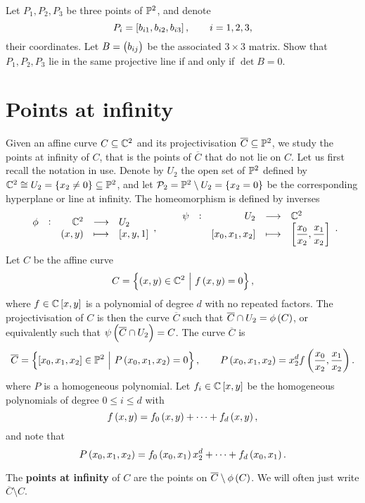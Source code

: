 \begin{exercise**}
\label{ex:19}
Let $ P_1, P_2, P_3 $ be three points of $ \mathbb{P}^2 $, and denote
$$ P_i = \sbr{b_{i1}, b_{i2}, b_{i3}}, \qquad i = 1, 2, 3, $$
their coordinates. Let $ B = \br{b_{ij}} $ be the associated $ 3 \times 3 $ matrix. Show that $ P_1, P_2, P_3 $ lie in the same projective line if and only if $ \det B = 0 $.
\end{exercise**}

\pagebreak

\section{Points at infinity}

Given an affine curve $ C \subseteq \mathbb{C}^2 $ and its projectivisation $ \overline{C} \subseteq \mathbb{P}^2 $, we study the points at infinity of $ C $, that is the points of $ \overline{C} $ that do not lie on $ C $. Let us first recall the notation in use. Denote by $ U_2 $ the open set of $ \mathbb{P}^2 $ defined by $ \CC^2 \cong U_2 = \cbr{x_2 \ne 0} \subseteq \PP^2 $, and let $ \PPP_2 = \PP^2 \setminus U_2 = \cbr{x_2 = 0} $ be the corresponding hyperplane or line at infinity. The homeomorphism is defined by inverses
$$ \function[\phi]{\CC^2}{U_2}{\br{x, y}}{\sbr{x, y, 1}}, \qquad \function[\psi]{U_2}{\CC^2}{\sbr{x_0, x_1, x_2}}{\sbr{\dfrac{x_0}{x_2}, \dfrac{x_1}{x_2}}}. $$
Let $ C $ be the affine curve
$$ C = \cbr{\br{x, y} \in \CC^2 \st f\br{x, y} = 0}, $$
where $ f \in \CC\sbr{x, y} $ is a polynomial of degree $ d $ with no repeated factors. The projectivisation of $ C $ is then the curve $ \overline{C} $ such that $ \overline{C} \cap U_2 = \phi\br{C} $, or equivalently such that $ \psi\br{\overline{C} \cap U_2} = C $. The curve $ \overline{C} $ is
$$ \overline{C} = \cbr{\sbr{x_0, x_1, x_2} \in \PP^2 \st P\br{x_0, x_1, x_2} = 0}, \qquad P\br{x_0, x_1, x_2} = x_2^df\br{\dfrac{x_0}{x_2}, \dfrac{x_1}{x_2}}. $$
where $ P $ is a homogeneous polynomial. Let $ f_i \in \CC\sbr{x, y} $ be the homogeneous polynomials of degree $ 0 \le i \le d $ with
$$ f\br{x, y} = f_0\br{x, y} + \dots + f_d\br{x, y}, $$
and note that
\begin{equation}
\label{eq:4}
P\br{x_0, x_1, x_2} = f_0\br{x_0, x_1}x_2^d + \dots + f_d\br{x_0, x_1}.
\end{equation}

\begin{definition}
The \textbf{points at infinity} of $ C $ are the points on $ \overline{C} \setminus \phi\br{C} $. We will often just write $ \overline{C} \setminus C $.
\end{definition}

